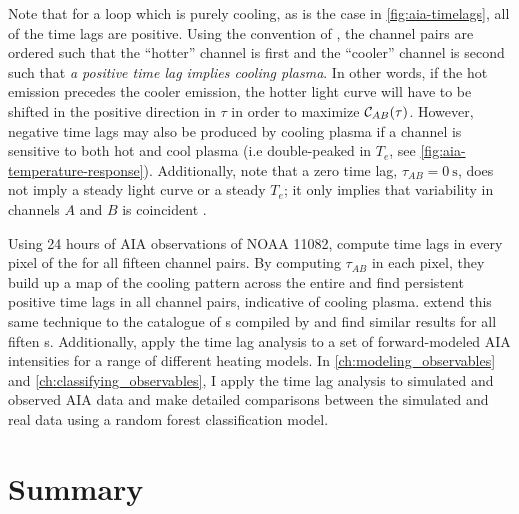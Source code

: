 Note that for a loop which is purely cooling, as is the case in \autoref{fig:aia-timelags}, all of the time lags are positive. Using the convention of \citet{viall_evidence_2012}, the channel pairs are ordered such that the ``hotter'' channel is first and the ``cooler'' channel is second such that \textit{a positive time lag implies cooling plasma}. In other words, if the hot emission precedes the cooler emission, the hotter light curve will have to be shifted in the positive direction in $\tau$ in order to maximize $\mathcal{C}_{AB}(\tau)$. However, negative time lags may also be produced by cooling plasma if a channel is sensitive to both hot and cool plasma (i.e double-peaked in $T_e$, see \autoref{fig:aia-temperature-response}). Additionally, note that a zero time lag, $\tau_{AB}=\SI{0}{\second}$, does not imply a steady light curve or a steady $T_e$; it only implies that variability in channels $A$ and $B$ is coincident \citep{viall_transition_2015,viall_signatures_2016}.

Using 24 hours of AIA observations of \AR{} NOAA 11082, \citet{viall_evidence_2012} compute time lags in every pixel of the \AR{} for all fifteen channel pairs. By computing $\tau_{AB}$ in each pixel, they build up a map of the cooling pattern across the entire \AR{} and find persistent positive time lags in all channel pairs, indicative of cooling plasma. \citet{viall_survey_2017} extend this same technique to the catalogue of \AR s compiled by \citet{warren_systematic_2012} and find similar results for all fiften \AR s. Additionally, \citet{bradshaw_patterns_2016} apply the time lag analysis to a set of forward-modeled AIA intensities for a range of different heating models. In \autoref{ch:modeling_observables} and \autoref{ch:classifying_observables}, I apply the time lag analysis to simulated and observed AIA data and make detailed comparisons between the simulated and real data using a random forest classification model.

\section{Summary}

